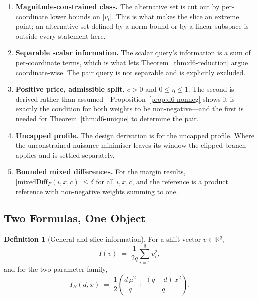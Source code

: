 \documentclass[conference]{IEEEtran}
\theoremstyle{definition}
\newtheorem{definition}[theorem]{Definition}
\begin{document}
\begin{enumerate}
\item[1)] \textbf{Magnitude-constrained class.} The alternative set is cut out by
per-coordinate lower bounds on $|v_{i}|$. This is what makes the slice an extreme point; an
alternative set defined by a norm bound or by a linear subspace is outside every statement
here.

\item[2)] \textbf{Separable scalar information.} The scalar query's information is a sum of
per-coordinate terms, which is what lets Theorem~\ref{thm:d6-reduction} argue coordinate-wise.
The pair query is not separable and is explicitly excluded.

\item[3)] \textbf{Positive price, admissible split.} $c>0$ and $0\le\eta\le1$. The second is
derived rather than assumed---Proposition~\ref{prop:d6-nonneg} shows it is exactly the condition
for both weights to be non-negative---and the first is needed for
Theorem~\ref{thm:d6-unique} to determine the pair.

\item[4)] \textbf{Uncapped profile.} The design derivation is for the uncapped profile. Where
the unconstrained nuisance minimiser leaves its window the clipped branch applies and is
settled separately.

\item[5)] \textbf{Bounded mixed differences.} For the margin results,
$|\mathrm{mixedDiff}_{F}(i,x,c)|\le\delta$ for all $i,x,c$, and the reference is a product
reference with non-negative weights summing to one.
\end{enumerate}

\subsection{Two Formulas, One Object}
\label{sec:d6-reduction}

\begin{definition}[General and slice information]
For a shift vector $v\in\mathbb{R}^{q}$,
\begin{equation}
I(v)\;=\;\frac{1}{2q}\sum_{i=1}^{q} v_{i}^{2},
\label{eq:d6-igen}
\end{equation}
and for the two-parameter family,
\begin{equation}
I_{B}(d,x)\;=\;\frac{1}{2}\left(\frac{d\,\mu^{2}}{q}+\frac{(q-d)\,x^{2}}{q}\right).
\label{eq:d6-ib}
\end{equation}
\end{definition}
\end{document}
